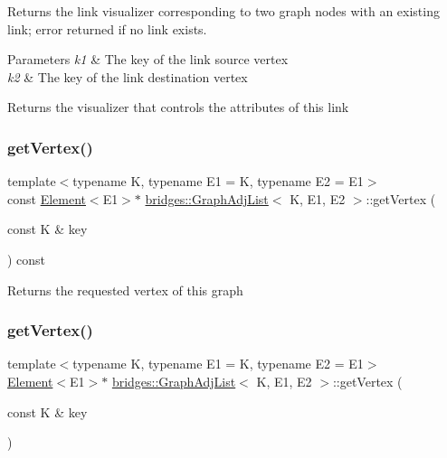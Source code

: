 Returns the link visualizer corresponding to two graph nodes with an existing link; error returned if no link exists.


\begin{DoxyParams}{Parameters}
{\em k1} & The key of the link source vertex \\
\hline
{\em k2} & The key of the link destination vertex\\
\hline
\end{DoxyParams}
\begin{DoxyReturn}{Returns}
the visualizer that controls the attributes of this link 
\end{DoxyReturn}
\mbox{\label{classbridges_1_1_graph_adj_list_a9a222bfc1d37f459caac60508b816fb6}} 
\subsubsection{\texorpdfstring{get\+Vertex()}{getVertex()}\hspace{0.1cm}{\footnotesize\ttfamily [1/2]}}
{\footnotesize\ttfamily template$<$typename K, typename E1 = K, typename E2 = E1$>$ \\
const \mbox{\hyperlink{classbridges_1_1_element}{Element}}$<$E1$>$$\ast$ \mbox{\hyperlink{classbridges_1_1_graph_adj_list}{bridges\+::\+Graph\+Adj\+List}}$<$ K, E1, E2 $>$\+::get\+Vertex (\begin{DoxyParamCaption}\item[{const K \&}]{key }\end{DoxyParamCaption}) const\hspace{0.3cm}{\ttfamily [inline]}}

\begin{DoxyReturn}{Returns}
the requested vertex of this graph 
\end{DoxyReturn}
\mbox{\label{classbridges_1_1_graph_adj_list_a8ba3aefe8e118ce8d8d6fab807e494c1}} 
\subsubsection{\texorpdfstring{get\+Vertex()}{getVertex()}\hspace{0.1cm}{\footnotesize\ttfamily [2/2]}}
{\footnotesize\ttfamily template$<$typename K, typename E1 = K, typename E2 = E1$>$ \\
\mbox{\hyperlink{classbridges_1_1_element}{Element}}$<$E1$>$$\ast$ \mbox{\hyperlink{classbridges_1_1_graph_adj_list}{bridges\+::\+Graph\+Adj\+List}}$<$ K, E1, E2 $>$\+::get\+Vertex (\begin{DoxyParamCaption}\item[{const K \&}]{key }\end{DoxyParamCaption})\hspace{0.3cm}{\ttfamily [inline]}}

